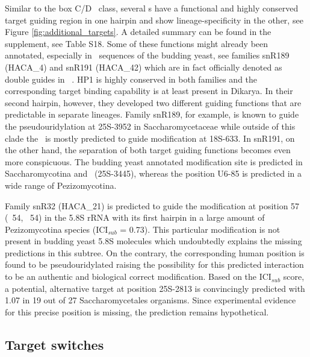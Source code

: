 Similar to the box C/D \sno\ class, several \haca s have a functional
and highly conserved target guiding region in one hairpin and show
lineage-specificity in the other, see Figure
\ref{fig:additional_targets}.  A detailed summary can be found in the
supplement, see Table S18. Some of these functions might already been
annotated, especially in \sno\ sequences of the budding yeast, see
families snR189 (HACA\_4) and snR191 (HACA\_42) which are in fact
officially denoted as double guides in \sce\ \cite{Badis:2003,
  Schattner:2004}.  HP1 is highly conserved in both families and the
corresponding target binding capability is at least present in
Dikarya. In their second hairpin, however, they developed two
different guiding functions that are predictable in separate
lineages. Family snR189, for example, is known to guide the
pseudouridylation at 25S-3952 in Saccharomycetaceae while outside of
this clade the \sno\ is mostly predicted to guide modification at
18S-633. In snR191, on the other hand, the separation of both target
guiding functions becomes even more conspicuous. The budding yeast
annotated modification site is predicted in Saccharomycotina and \Tde\
(25S-3445), whereas the position U6-85 is predicted in a wide range of
Pezizomycotina.

Family snR32 (HACA\_21) is predicted to guide the modification at
position 57 (\ncr\ 54, \sce\ 54) in the 5.8S rRNA with its first
hairpin in a large amount of Pezizomycotina species (ICI$_{sub}$ =
0.73). This particular modification is not present in budding yeast
5.8S molecules which undoubtedly explains the missing predictions in
this subtree. On the contrary, the corresponding human position is
found to be pseudouridylated raising the possibility for this
predicted interaction to be an authentic and biological correct
modification.  Based on the ICI$_{sub}$ score, a potential,
alternative target at position 25S-2813 is convincingly predicted with
1.07 in 19 out of 27 Saccharomycetales organisms. Since experimental
evidence for this precise position is missing, the prediction remains
hypothetical.

\subsection{Target switches}

